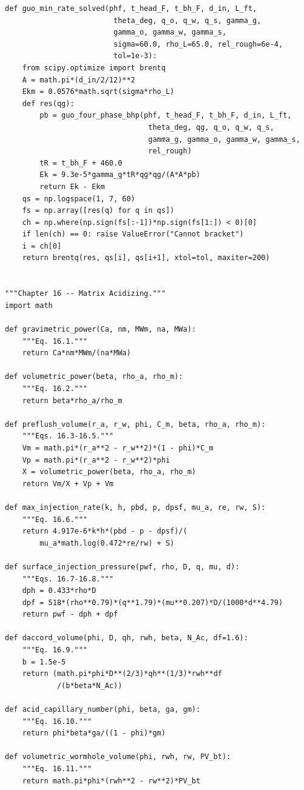 \documentclass[10pt,a4paper,openany]{book}
\begin{document}
\begin{lstlisting}
def guo_min_rate_solved(phf, t_head_F, t_bh_F, d_in, L_ft,
                         theta_deg, q_o, q_w, q_s, gamma_g,
                         gamma_o, gamma_w, gamma_s,
                         sigma=60.0, rho_L=65.0, rel_rough=6e-4,
                         tol=1e-3):
    from scipy.optimize import brentq
    A = math.pi*(d_in/2/12)**2
    Ekm = 0.0576*math.sqrt(sigma*rho_L)
    def res(qg):
        pb = guo_four_phase_bhp(phf, t_head_F, t_bh_F, d_in, L_ft,
                                 theta_deg, qg, q_o, q_w, q_s,
                                 gamma_g, gamma_o, gamma_w, gamma_s,
                                 rel_rough)
        tR = t_bh_F + 460.0
        Ek = 9.3e-5*gamma_g*tR*qg*qg/(A*A*pb)
        return Ek - Ekm
    qs = np.logspace(1, 7, 60)
    fs = np.array([res(q) for q in qs])
    ch = np.where(np.sign(fs[:-1])*np.sign(fs[1:]) < 0)[0]
    if len(ch) == 0: raise ValueError("Cannot bracket")
    i = ch[0]
    return brentq(res, qs[i], qs[i+1], xtol=tol, maxiter=200)
\end{lstlisting}

\chapter{}
\begin{lstlisting}
"""Chapter 16 -- Matrix Acidizing."""
import math

def gravimetric_power(Ca, nm, MWm, na, MWa):
    """Eq. 16.1."""
    return Ca*nm*MWm/(na*MWa)

def volumetric_power(beta, rho_a, rho_m):
    """Eq. 16.2."""
    return beta*rho_a/rho_m

def preflush_volume(r_a, r_w, phi, C_m, beta, rho_a, rho_m):
    """Eqs. 16.3-16.5."""
    Vm = math.pi*(r_a**2 - r_w**2)*(1 - phi)*C_m
    Vp = math.pi*(r_a**2 - r_w**2)*phi
    X = volumetric_power(beta, rho_a, rho_m)
    return Vm/X + Vp + Vm

def max_injection_rate(k, h, pbd, p, dpsf, mu_a, re, rw, S):
    """Eq. 16.6."""
    return 4.917e-6*k*h*(pbd - p - dpsf)/(
        mu_a*math.log(0.472*re/rw) + S)

def surface_injection_pressure(pwf, rho, D, q, mu, d):
    """Eqs. 16.7-16.8."""
    dph = 0.433*rho*D
    dpf = 518*(rho**0.79)*(q**1.79)*(mu**0.207)*D/(1000*d**4.79)
    return pwf - dph + dpf

def daccord_volume(phi, D, qh, rwh, beta, N_Ac, df=1.6):
    """Eq. 16.9."""
    b = 1.5e-5
    return (math.pi*phi*D**(2/3)*qh**(1/3)*rwh**df
            /(b*beta*N_Ac))

def acid_capillary_number(phi, beta, ga, gm):
    """Eq. 16.10."""
    return phi*beta*ga/((1 - phi)*gm)

def volumetric_wormhole_volume(phi, rwh, rw, PV_bt):
    """Eq. 16.11."""
    return math.pi*phi*(rwh**2 - rw**2)*PV_bt
\end{lstlisting}
\end{document}
